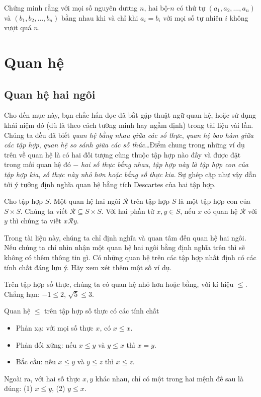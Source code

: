 \begin{exercise}
    Chứng minh rằng với mọi số nguyên dương $n$, hai bộ-$n$ có thứ tự $(a_{1}, a_{2}, \ldots, a_{n})$ và $(b_{1}, b_{2}, \ldots, b_{n})$ bằng nhau khi và chỉ khi $a_{i} = b_{i}$ với mọi số tự nhiên $i$ không vượt quá $n$.
\end{exercise}

\section{Quan hệ}

\subsection{Quan hệ hai ngôi}

Cho đến mục này, bạn chắc hẳn đọc đã bắt gặp thuật ngữ quan hệ, hoặc sử dụng khái niệm đó (dù là theo cách tường minh hay ngầm định) trong tài liệu vài lần. Chúng ta đều đã biết \textit{quan hệ bằng nhau giữa các số thực}, \textit{quan hệ bao hàm giữa các tập hợp}, \textit{quan hệ so sánh giữa các số thức}\ldots Điểm chung trong những ví dụ trên về quan hệ là có hai đối tượng cùng thuộc tập hợp nào đấy và được đặt trong mối quan hệ đó $-$ \textit{hai số thực bằng nhau}, \textit{tập hợp này là tập hợp con của tập hợp kia}, \textit{số thực này nhỏ hơn hoặc bằng số thực kia}. Sự ghép cặp như vậy dẫn tới ý tưởng định nghĩa quan hệ bằng tích Descartes của hai tập hợp.

\begin{definition}
    Cho tập hợp $S$. Một quan hệ hai ngôi $\mathscr{R}$ trên tập hợp $S$ là một tập hợp con của $S\times S$. Chúng ta viết $\mathscr{R}\subseteq S\times S$. Với hai phần tử $x, y\in S$, nếu $x$ có quan hệ $\mathscr{R}$ với $y$ thì chúng ta viết $x\mathscr{R}y$.
\end{definition}

Trong tài liệu này, chúng ta chỉ định nghĩa và quan tâm đến quan hệ hai ngôi. Nếu chúng ta chỉ nhìn nhận một quan hệ hai ngôi bằng định nghĩa trên thì sẽ không có thêm thông tin gì. Có những quan hệ trên các tập hợp nhất định có các tính chất đáng lưu ý. Hãy xem xét thêm một số ví dụ.

\begin{example}
    Trên tập hợp số thực, chúng ta có quan hệ nhỏ hơn hoặc bằng, với kí hiệu $\leq$. Chẳng hạn: $-1\leq 2$, $\sqrt{5}\leq 3$.

    \noindent Quan hệ $\leq$ trên tập hợp số thực có các tính chất
    \begin{itemize}
        \item Phản xạ: với mọi số thực $x$, có $x\leq x$.
        \item Phản đối xứng: nếu $x\leq y$ và $y\leq x$ thì $x = y$.
        \item Bắc cầu: nếu $x\leq y$ và $y\leq z$ thì $x\leq z$.
    \end{itemize}

    Ngoài ra, với hai số thực $x, y$ khác nhau, chỉ có một trong hai mệnh đề sau là đúng: (1) $x\leq y$, (2) $y\leq x$.
\end{example}

